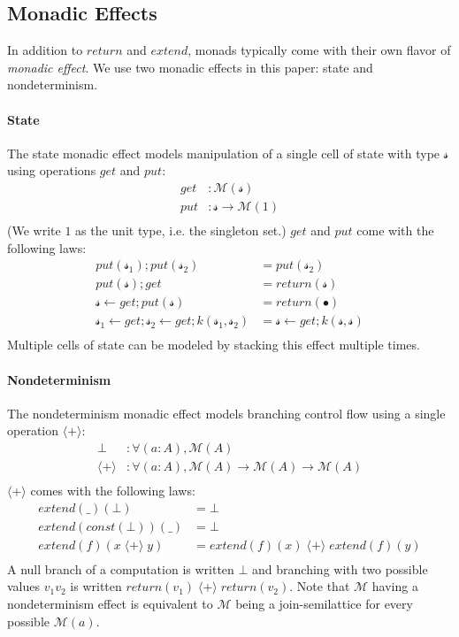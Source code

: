 \documentclass{article}
\begin{document}

\subsection{Monadic Effects}
\label{MonadicEffects}

In addition to $return$ and $extend$, monads typically come with their own flavor of \emph{monadic effect}.
We use two monadic effects in this paper: state and nondeterminism.

\paragraph{State}
The state monadic effect models manipulation of a single cell of state with type $𝓈$ using operations $get$ and $put$:
\begin{align*}
  get &: ℳ (𝓈)      \\
  put &: 𝓈 → ℳ (1)  \\
\end{align*}
(We write $1$ as the unit type, i.e. the singleton set.)
$get$ and $put$ come with the following laws:
\begin{align*}
               put(𝓈_1) ; put(𝓈_2) &= put (𝓈_2)           \\
                      put(𝓈) ; get &= return(𝓈)           \\
                  𝓈 ← get ; put(𝓈) &= return(∙)           \\
𝓈_1 ← get ; 𝓈_2 ← get ; k(𝓈_1,𝓈_2) &= 𝓈 ← get ; k(𝓈,𝓈)    \\
\end{align*}
Multiple cells of state can be modeled by stacking this effect multiple times.  

\paragraph{Nondeterminism}
The nondeterminism monadic effect models branching control flow using a single operation $⟨+⟩$:
\begin{align*}
    ⊥ &: ∀ (a : A), ℳ (A)                  \\
  ⟨+⟩ &: ∀ (a : A), ℳ (A) → ℳ (A) → ℳ (A)  \\
\end{align*}
$⟨+⟩$ comes with the following laws:
\begin{align*}
         extend(\_)(⊥) &= ⊥                                \\
  extend(const(⊥))(\_) &= ⊥                                \\
    extend(f)(x\; ⟨+⟩\; y) &= extend(f)(x)\; ⟨+⟩\; extend(f)(y)    \\
\end{align*}
A null branch of a computation is written $⊥ $ and branching with two possible values $v_1 v_2$ is written $return(v_1)\; ⟨+⟩\; return(v_2)$.
Note that $ℳ $ having a nondeterminism effect is equivalent to $ℳ $ being a join-semilattice for every possible $ℳ (a)$.
\end{document}
